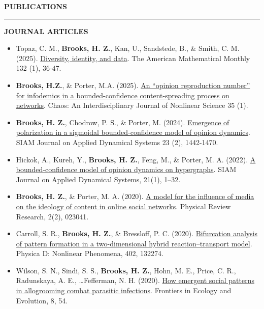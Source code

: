 \documentclass{resume} %
\renewenvironment{rSection}[1]{
\sectionskip
\textcolor{WinePurple}{\MakeUppercase{#1}}
\sectionlineskip
\hrule
\begin{list}{}{
\setlength{\leftmargin}{1.5em}
}
\item[]
}{
\end{list}
}
\begin{document}
\begin{rSection}{\bf Publications} \itemsep -2pt

\medskip

\uppercase{{\bf Journal Articles}}

\begin{itemize}
    \item Topaz, C. M., {\bf Brooks, H. Z.}, Kan, U., Sandstede, B., \& Smith, C. M. (2025). \href{https://www.tandfonline.com/doi/full/10.1080/00029890.2024.2409608}{Diversity, identity, and data}.
    The American Mathematical Monthly 132 (1), 36-47.

    \item {\bf Brooks, H.Z.}, \& Porter, M.A. (2025). \href{(https://pubs.aip.org/aip/cha/article/35/1/013160/3333167)}{An ``opinion reproduction number'' for infodemics in a bounded-confidence content-spreading process on networks}.
    Chaos: An Interdisciplinary Journal of Nonlinear Science 35 (1).

    \item {\bf Brooks, H. Z.}, Chodrow, P. S., \& Porter, M. (2024). \href{https://epubs.siam.org/doi/pdf/10.1137/22M1527258}{Emergence of polarization in a sigmoidal bounded-confidence model of opinion dynamics}. 
    SIAM Journal on Applied Dynamical Systems 23 (2), 1442-1470.

    \item Hickok, A., Kureh, Y., {\bf Brooks, H. Z.}, Feng, M., \& Porter, M. A. (2022). \href{https://epubs.siam.org/doi/pdf/10.1137/21M1399427}{A bounded-confidence model of
    opinion dynamics on hypergraphs}. SIAM Journal on Applied Dynamical Systems, 21(1), 1–32.

    \item {\bf Brooks, H. Z.}, \& Porter, M. A. (2020). \href{https://link.aps.org/pdf/10.1103/PhysRevResearch.2.023041}{A model for the influence of media on the ideology of content in
    online social networks}. Physical Review Research, 2(2), 023041.

    \item Carroll, S. R., {\bf Brooks, H. Z.}, \& Bressloﬀ, P. C. (2020). \href{https://www.sciencedirect.com/science/article/am/pii/S0167278919300685}{Bifurcation analysis of pattern formation in a
    two-dimensional hybrid reaction–transport model}. Physica D: Nonlinear Phenomena, 402, 132274.

    \item Wilson, S. N., Sindi, S. S., {\bf Brooks, H. Z.}, Hohn, M. E., Price, C. R., Radunskaya, A. E., \dots Feﬀerman, N. H. (2020). \href{https://www.frontiersin.org/articles/10.3389/fevo.2020.00054/full}{How emergent social patterns in allogrooming combat parasitic infections}.
    Frontiers in Ecology and Evolution, 8, 54.


\end{itemize}
\end{rSection}
\end{document}
